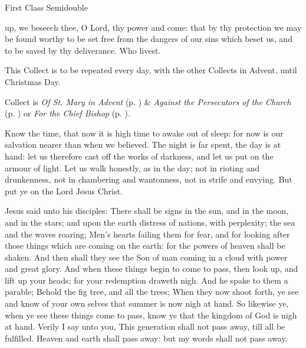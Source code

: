 \fancyhead[RE,LO]{}

   \label{AdventI}
\begin{inhead}
    {First Class Semidouble}
\end{inhead}

\collect
{} up, we beseech thee, O Lord, thy power and come: that by thy protection we may be found worthy to be set free from the dangers of our sins which beset us, and to be saved by thy deliverance. Who livest.
\begin{rubric}
    This Collect is to be repeated every day, with the other Collects in Advent, until Christmas Day.
\end{rubric}
\begin{rubric}
     Collect is \emph{Of St. Mary in Advent} (p. \pageref{SPMaryInAdvent}) \&  \emph{Against the Persecutors of the Church} (p. \pageref{SPAgainst}) or \emph{For the Chief Bishop} (p. \pageref{SPChiefBishop}).
\end{rubric}
 Know the time, that now it is high time to awake out of sleep: for now is our salvation nearer than when we believed. The night is far spent, the day is at hand: let us therefore cast off the works of darkness, and let us put on the armour of light. Let us walk honestly, as in the day; not in rioting and drunkenness, not in chambering and wantonness, not in strife and envying. But put ye on the Lord Jesus Christ.

 Jesus said unto his disciples: There shall be signs in the sun, and in the moon, and in the stars; and upon the earth distress of nations, with perplexity; the sea and the waves roaring; Men's hearts failing them for fear, and for looking after those things which are coming on the earth: for the powers of heaven shall be shaken. And then shall they see the Son of man coming in a cloud with power and great glory. And when these things begin to come to pass, then look up, and lift up your heads; for your redemption draweth nigh. And he spake to them a parable; Behold the fig tree, and all the trees; When they now shoot forth, ye see and know of your own selves that summer is now nigh at hand. So likewise ye, when ye see these things come to pass, know ye that the kingdom of God is nigh at hand. Verily I say unto you, This generation shall not pass away, till all be fulfilled. Heaven and earth shall pass away: but my words shall not pass away.

